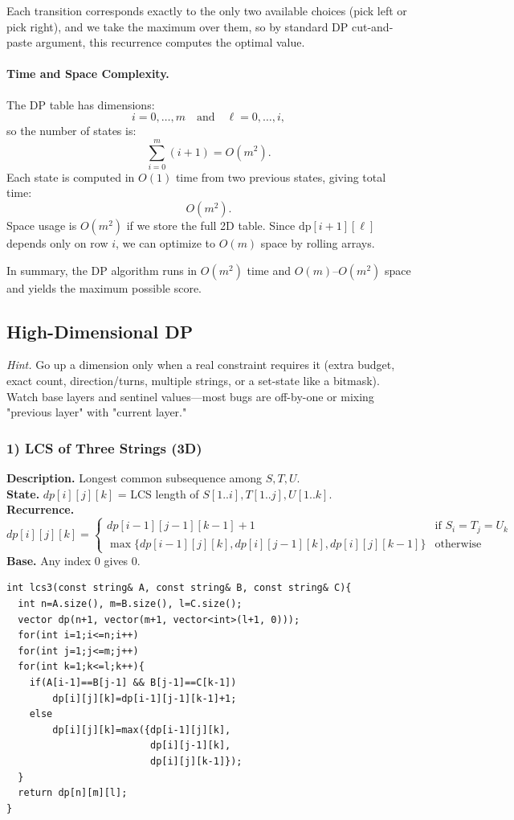 \documentclass[9pt]{extarticle}
\begin{document}
Each transition corresponds exactly to the only two available choices (pick left or pick right), and we take the maximum over them, so by standard DP cut-and-paste argument, this recurrence computes the optimal value.

\paragraph{Time and Space Complexity.}
The DP table has dimensions:
\[
i = 0,\dots,m \quad\text{and}\quad \ell = 0,\dots,i,
\]
so the number of states is:
\[
\sum_{i=0}^{m} (i+1) = O(m^2).
\]
Each state is computed in \(O(1)\) time from two previous states, giving total time:
\[
\boxed{O(m^2).}
\]
Space usage is \(O(m^2)\) if we store the full 2D table. Since \(\text{dp}[i+1][\ell]\) depends only on row \(i\), we can optimize to \(O(m)\) space by rolling arrays.

In summary, the DP algorithm runs in \(O(m^2)\) time and \(O(m)\)–\(O(m^2)\) space and yields the maximum possible score.

\subsection{High-Dimensional DP}
\textit{Hint.} Go up a dimension only when a real constraint requires it (extra budget, exact count, direction/turns, multiple strings, or a set-state like a bitmask). Watch base layers and sentinel values—most bugs are off-by-one or mixing "previous layer" with "current layer."

\subsubsection{1) LCS of Three Strings (3D)}
\textbf{Description.} Longest common subsequence among \(S,T,U\).  \\
\textbf{State.} \(dp[i][j][k]\) = LCS length of \(S[1..i],T[1..j],U[1..k]\).  \\
\textbf{Recurrence.}
\[
dp[i][j][k]=\begin{cases}
dp[i-1][j-1][k-1]+1 & \text{if } S_i=T_j=U_k\\
\max\{dp[i-1][j][k],dp[i][j-1][k],dp[i][j][k-1]\} & \text{otherwise}
\end{cases}
\]
\textbf{Base.} Any index 0 gives 0.  
\begin{verbatim}
int lcs3(const string& A, const string& B, const string& C){
  int n=A.size(), m=B.size(), l=C.size();
  vector dp(n+1, vector(m+1, vector<int>(l+1, 0)));
  for(int i=1;i<=n;i++) 
  for(int j=1;j<=m;j++) 
  for(int k=1;k<=l;k++){
    if(A[i-1]==B[j-1] && B[j-1]==C[k-1]) 
        dp[i][j][k]=dp[i-1][j-1][k-1]+1;
    else 
        dp[i][j][k]=max({dp[i-1][j][k], 
                         dp[i][j-1][k], 
                         dp[i][j][k-1]});
  }
  return dp[n][m][l];
}
\end{verbatim}
\end{document}
